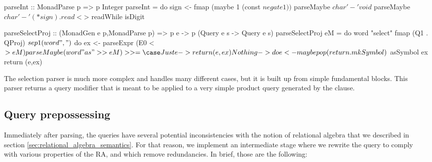 \begin{code}
  \begin{haskellcode}
    parseInt :: MonadParse p => p Integer
    parseInt = do
      sign <- fmap (maybe 1 (const $ negate 1)) $ parseMaybe $ char '-'
      void $ parseMaybe $ char '-'
      (* sign) . read <$> readWhile isDigit

    parseSelectProj
      :: (MonadGen e p,MonadParse p)
      => p e -> p (Query e s -> Query e s)
    parseSelectProj eM = do
      word "select"
      fmap (Q1 . QProj) $ sep1 (word ",") $ do
      ex <- parseExpr (E0 <$> eM)
      parseMaybe (word "as" >> eM) >>= \case
        Just e -> return (e,ex)
        Nothing -> do
      e <- maybe pop (return . mkSymbol) $ asSymbol ex
      return (e,ex)
  \end{haskellcode}
  \caption{\label{lst:simple_parse}The selection parser is much more complex
    and handles many different cases, but it is built up from simple
    fundamental blocks. This parser returns a query modifier that is
    meant to be applied to a very simple product query generated by the
     clause.}
\end{code}

\subsection{Query prepossessing}

Immediately after parsing, the queries have several potential
inconsistencies with the notion of relational algebra that we
described in section \ref{sec:relational_algebra_semantics}. 
For that reason, we implement an intermediate stage
where we rewrite the query to comply with various properties of the
RA, and which remove redundancies. In brief, those are the following:

